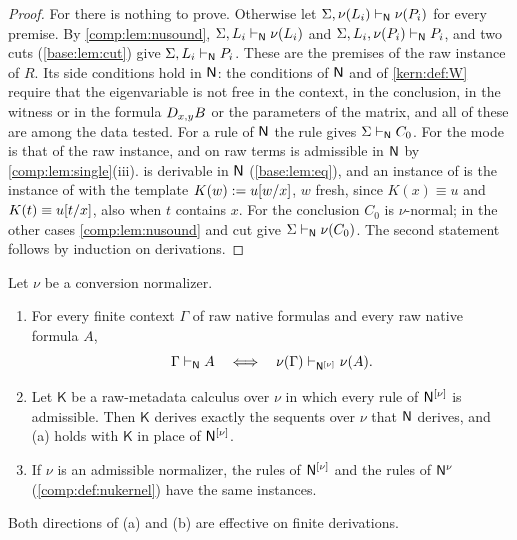 \begin{proof}
For  there is nothing to prove. Otherwise let
$\Sigma,\nu(L_i)\vdash_{\mathsf{N}}\nu(P_i)$ for every premise. By
\cref{comp:lem:nusound}, $\Sigma,L_i\vdash_{\mathsf{N}}\nu(L_i)$ and
$\Sigma,L_i,\nu(P_i)\vdash_{\mathsf{N}}P_i$, and two cuts (\cref{base:lem:cut})
give $\Sigma,L_i\vdash_{\mathsf{N}}P_i$. These are the premises of the raw
instance of $R$. Its side conditions hold in $\mathsf{N}$: the conditions of
$\mathsf{N}$ and of \cref{kern:def:W} require that the eigenvariable is not free
in the context, in the conclusion, in the witness or in the formula
$D_{x,y}B$ or the parameters of the matrix, and all of these are among the
data tested. For a rule of $\mathsf{N}$ the rule gives $\Sigma\vdash_{\mathsf{N}}C_0$.
For  the mode is that of the raw instance, and 
on raw terms is admissible in $\mathsf{N}$ by \cref{comp:lem:single}(iii).
 is derivable in $\mathsf{N}$ (\cref{base:lem:eq}), and an instance
of  is the instance of  with the template
$K(w)\mathrel{:=} u[w/x]$, $w$ fresh, since $K(x)\equiv u$ and
$K(t)\equiv u[t/x]$, also when $t$ contains $x$. For
 the conclusion $C_0$ is $\nu$-normal; in the other cases
\cref{comp:lem:nusound} and cut give $\Sigma\vdash_{\mathsf{N}}\nu(C_0)$. The
second statement follows by induction on derivations.
\end{proof}

\begin{theorem}
\label{comp:thm:rawtransfer}
Let $\nu$ be a conversion normalizer.
\begin{enumerate}[label=(\alph*)]
\item For every finite context $\Gamma$ of raw native formulas and every raw
 native formula $A$,
 \[
  \Gamma\vdash_{\mathsf{N}}A
  \quad\Longleftrightarrow\quad
  \nu(\Gamma)\vdash_{\mathsf{N}^{[\nu]}}\nu(A).
 \]
\item Let $\mathsf K$ be a raw-metadata calculus over $\nu$ in which every
 rule of $\mathsf{N}^{[\nu]}$ is admissible. Then $\mathsf K$ derives exactly the
 sequents over $\nu$ that $\mathsf{N}$ derives, and (a) holds with $\mathsf K$ in
 place of $\mathsf{N}^{[\nu]}$.
\item If $\nu$ is an admissible normalizer, the rules of $\mathsf{N}^{[\nu]}$ and
 the rules of $\mathsf{N}^{\nu}$ (\cref{comp:def:nukernel}) have the same
 instances.
\end{enumerate}
Both directions of (a) and (b) are effective on finite derivations.
\end{theorem}

